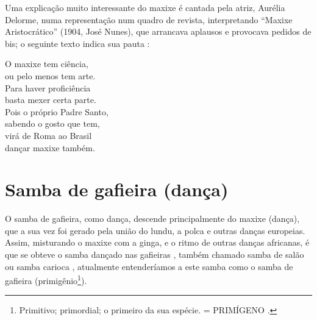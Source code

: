 Uma explicação muito interessante do maxixe é cantada pela atriz, Aurélia Delorme,
numa representação num quadro de revista, interpretando  ``Maxixe Aristocrático'' (1904, José Nunes), 
que arrancava aplausos e provocava pedidos de bis;
o seguinte texto indica sua pauta \cite[pp. 80-81]{efege1974maxixe} \cite{REIS2003}: 
\begin{citando}
O maxixe tem ciência,\\
ou pelo menos tem arte.\\
Para haver proficiência\\
basta mexer certa parte.\\
Pois o próprio Padre Santo,\\
sabendo o gosto que tem,\\
virá de Roma ao Brasil\\
dançar maxixe também.\\ 
\end{citando}



\section{Samba de gafieira (dança)}
O samba de gafieira, como dança, descende principalmente do maxixe (dança),
que a sua vez foi gerado  pela união do  lundu, 
a polca e outras danças europeias.
Assim, misturando o maxixe com a ginga, e o ritmo de outras danças africanas, 
é que se obteve o samba dançado nas gafieiras \cite[pp. 139]{perna2002samba}, também chamado
samba de salão ou samba carioca \cite[pp. 50]{fornaciari1947aprender},
atualmente entenderíamos a este samba como o samba de gafieira (primigênio\footnote{
Primitivo; primordial; o primeiro da sua espécie. = PRIMÍGENO \cite{priberamprimigenio}.
}).




